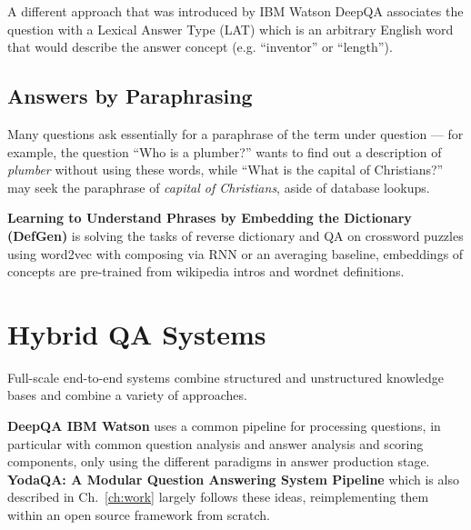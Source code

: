 A different approach that was introduced by IBM Watson DeepQA \citep{WatsonTyCor}
associates the question with a Lexical Answer Type (LAT) which is
an arbitrary English word that would describe the answer concept
(e.g. ``inventor'' or ``length'').

%
%
%
%
%

\subsection{Answers by Paraphrasing}

Many questions ask essentially for a paraphrase of the term under
question --- for example, the question ``Who is a plumber?'' wants
to find out a description of \textit{plumber} without using these
words, while ``What is the capital of Christians?'' may seek the
paraphrase of \textit{capital of Christians}, aside of database lookups.

\textbf{Learning to Understand Phrases by Embedding the Dictionary (DefGen)} \citep{DefGen}
	is solving the tasks of reverse dictionary and QA on crossword puzzles
	using word2vec
	with composing via RNN or an averaging baseline, embeddings of
	concepts are pre-trained from wikipedia intros and wordnet definitions.



\section{Hybrid QA Systems}

Full-scale end-to-end systems combine structured and unstructured knowledge bases
and combine a variety of approaches.

\textbf{DeepQA IBM Watson} \citep{WatsonOverview}
uses a common pipeline for processing questions, in particular
with common question analysis and answer analysis and scoring components,
only using the different paradigms in answer production stage.
\textbf{YodaQA: A Modular Question Answering System Pipeline} \citep{YodaQAPoster2015}
which is also described in Ch.~\ref{ch:work} largely follows these ideas,
reimplementing them within an open source framework from scratch.

